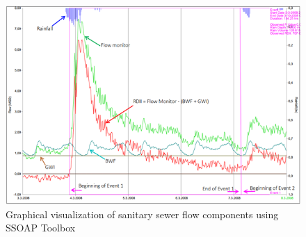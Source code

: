 \begin{figure}[h]
    \centering
	\includegraphics[scale=1.2]{figures/SSOAP_example.png}
	\caption{Graphical visualization of sanitary sewer flow components using SSOAP Toolbox}
	\label{fig:SSOAPexample}
\end{figure}